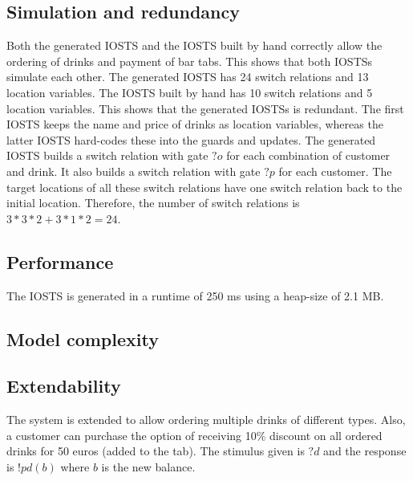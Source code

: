 \subsection{Simulation and redundancy}
Both the generated IOSTS and the IOSTS built by hand correctly allow the ordering of drinks and payment of bar tabs. This shows that both IOSTSs simulate each other. The generated IOSTS has 24 switch relations and 13 location variables. The IOSTS built by hand has 10 switch relations and 5 location variables. This shows that the generated IOSTSs is redundant. The first IOSTS keeps the name and price of drinks as location variables, whereas the latter IOSTS hard-codes these into the guards and updates. The generated IOSTS builds a switch relation with gate $?o$ for each combination of customer and drink. It also builds a switch relation with gate $?p$ for each customer. The target locations of all these switch relations have one switch relation back to the initial location. Therefore, the number of switch relations is $3*3*2+3*1*2 = 24$.

\subsection{Performance}
The IOSTS is generated in a runtime of 250 ms using a heap-size of 2.1 MB.

\subsection{Model complexity}


\subsection{Extendability}
The system is extended to allow ordering multiple drinks of different types. Also, a customer can purchase the option of receiving 10\% discount on all ordered drinks for 50 euros (added to the tab). The stimulus given is $?\mathit{d}$ and the response is $!pd(b)$ where $b$ is the new balance.

\begin{comment}
\section{Example 5: communication protocol}
\end{comment}


